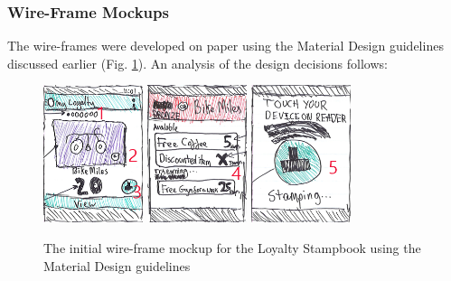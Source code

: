 \subsubsection{Wire-Frame Mockups}
The wire-frames were developed on paper using the Material Design guidelines discussed earlier (Fig. \ref{fig:wireframe1}). An analysis of the design decisions follows: 
\begin{figure}[H]
 \centering
  \includegraphics[width=0.26\textwidth]{img/wireframeMockup.png}
    \includegraphics[width=0.26\textwidth]{img/wireframeMockup2.png}
    \includegraphics[width=0.26\textwidth]{img/wireframeMockup3.png}
    \caption{The initial wire-frame mockup for the Loyalty Stampbook using the Material Design guidelines}
         \label{fig:wireframe1}
\end{figure}

